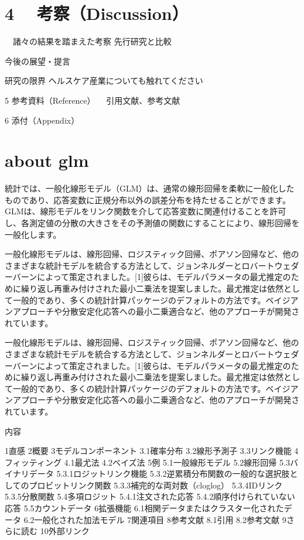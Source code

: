 \documentclass[a4j,11pt,mc, twocolumn]{jreport}
\begin{document}
\chapter{4	　考察（Discussion）}
  　諸々の結果を踏まえた考察
先行研究と比較


今後の展望・提言


研究の限界
 ヘルスケア産業についても触れてください


5 参考資料（Reference）
 　引用文献、参考文献

6 添付（Appendix）





\chapter{about glm}


統計では、一般化線形モデル（GLM）は、通常の線形回帰を柔軟に一般化したものであり、応答変数に正規分布以外の誤差分布を持たせることができます。 GLMは、線形モデルをリンク関数を介して応答変数に関連付けることを許可し、各測定値の分散の大きさをその予測値の関数にすることにより、線形回帰を一般化します。

一般化線形モデルは、線形回帰、ロジスティック回帰、ポアソン回帰など、他のさまざまな統計モデルを統合する方法として、ジョンネルダーとロバートウェダーバーンによって策定されました。[1]彼らは、モデルパラメータの最尤推定のために繰り返し再重み付けされた最小二乗法を提案しました。最尤推定は依然として一般的であり、多くの統計計算パッケージのデフォルトの方法です。ベイジアンアプローチや分散安定化応答への最小二乗適合など、他のアプローチが開発されています。



一般化線形モデルは、線形回帰、ロジスティック回帰、ポアソン回帰など、他のさまざまな統計モデルを統合する方法として、ジョンネルダーとロバートウェダーバーンによって策定されました。[1]彼らは、モデルパラメータの最尤推定のために繰り返し再重み付けされた最小二乗法を提案しました。最尤推定は依然として一般的であり、多くの統計計算パッケージのデフォルトの方法です。ベイジアンアプローチや分散安定化応答への最小二乗適合など、他のアプローチが開発されています。

内容


1直感
2概要
3モデルコンポーネント
3.1確率分布
3.2線形予測子
3.3リンク機能
4フィッティング
4.1最尤法
4.2ベイズ法
5例
5.1一般線形モデル
5.2線形回帰
5.3バイナリデータ
5.3.1ロジットリンク機能
5.3.2逆累積分布関数の一般的な選択肢としてのプロビットリンク関数
5.3.3補完的な両対数（cloglog）
5.3.4IDリンク
5.3.5分散関数
5.4多項ロジット
5.4.1注文された応答
5.4.2順序付けられていない応答
5.5カウントデータ
6拡張機能
6.1相関データまたはクラスター化されたデータ
6.2一般化された加法モデル
7関連項目
8参考文献
8.1引用
8.2参考文献
9さらに読む
10外部リンク
\end{document}
